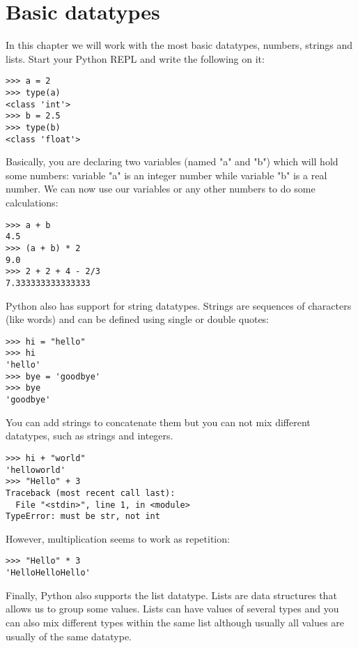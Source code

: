 \chapter{Basic datatypes}\label{basic-datatypes}

In this chapter we will work with the most basic datatypes, numbers, strings and lists. Start your Python REPL and write the following on it:

\begin{lstlisting}
>>> a = 2
>>> type(a)
<class 'int'>
>>> b = 2.5
>>> type(b)
<class 'float'>
\end{lstlisting}

Basically, you are declaring two variables (named "a" and "b") which will hold some numbers: variable "a" is an integer number while variable "b" is a real number. We can now use our variables or any other numbers to do some calculations:

\begin{lstlisting}
>>> a + b
4.5
>>> (a + b) * 2
9.0
>>> 2 + 2 + 4 - 2/3
7.333333333333333
\end{lstlisting}

Python also has support for string datatypes. Strings are sequences of characters (like words) and can be defined using single or double quotes:

\begin{lstlisting}
>>> hi = "hello"
>>> hi
'hello'
>>> bye = 'goodbye'
>>> bye
'goodbye'
\end{lstlisting}

You can add strings to concatenate them but you can not mix different datatypes, such as strings and integers.

\begin{lstlisting}
>>> hi + "world"
'helloworld'
>>> "Hello" + 3
Traceback (most recent call last):
  File "<stdin>", line 1, in <module>
TypeError: must be str, not int
\end{lstlisting}

However, multiplication seems to work as repetition:

\begin{lstlisting}
>>> "Hello" * 3
'HelloHelloHello'
\end{lstlisting}

Finally, Python also supports the list datatype. Lists are data structures that allows us to group some values. Lists can have values of several types and you can also mix different types within the same list although usually all values are usually of the same datatype. 

